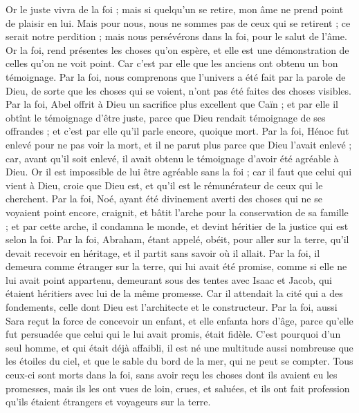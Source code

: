 \begin{multicols}{2}
Or le juste vivra de la foi ; mais si quelqu'un se retire, mon âme ne prend point de plaisir en lui.
Mais pour nous, nous ne sommes pas de ceux qui se retirent ; ce serait notre perdition ; mais nous persévérons dans la foi, pour le salut de l'âme.
\VerseOne{}Or la foi, rend présentes les choses qu'on espère, et elle est une démonstration de celles qu'on ne voit point.
Car c'est par elle que les anciens ont obtenu un bon témoignage.
Par la foi, nous comprenons que l'univers a été fait par la parole de Dieu, de sorte que les choses qui se voient, n'ont pas été faites des choses visibles.
Par la foi, Abel offrit à Dieu un sacrifice plus excellent que Caïn ; et par elle il obtînt le témoignage d'être juste, parce que Dieu rendait témoignage de ses offrandes ; et c'est par elle qu'il parle encore, quoique mort.
Par la foi, Hénoc fut enlevé pour ne pas voir la mort, et il ne parut plus parce que Dieu l'avait enlevé ; car, avant qu'il soit enlevé, il avait obtenu le témoignage d'avoir été agréable à Dieu.
Or il est impossible de lui être agréable sans la foi ; car il faut que celui qui vient à Dieu, croie que Dieu est, et qu'il est le rémunérateur de ceux qui le cherchent.
Par la foi, Noé, ayant été divinement averti des choses qui ne se voyaient point encore, craignit, et bâtit l'arche pour la conservation de sa famille ; et par cette arche, il condamna le monde, et devint héritier de la justice qui est selon la foi.
Par la foi, Abraham, étant appelé, obéit, pour aller sur la terre, qu'il devait recevoir en héritage, et il partit sans savoir où il allait.
Par la foi, il demeura comme étranger sur la terre, qui lui avait été promise, comme si elle ne lui avait point appartenu, demeurant sous des tentes avec Isaac et Jacob, qui étaient héritiers avec lui de la même promesse.
Car il attendait la cité qui a des fondements, celle dont Dieu est l'architecte et le constructeur.
Par la foi, aussi Sara reçut la force de concevoir un enfant, et elle enfanta hors d'âge, parce qu'elle fut persuadée que celui qui le lui avait promis, était fidèle.
C'est pourquoi d'un seul homme, et qui était déjà affaibli, il est né une multitude aussi nombreuse que les étoiles du ciel, et que le sable du bord de la mer, qui ne peut se compter.
Tous ceux-ci sont morts dans la foi, sans avoir reçu les choses dont ils avaient eu les promesses, mais ils les ont vues de loin, crues, et saluées, et ils ont fait profession qu'ils étaient étrangers et voyageurs sur la terre.

\end{multicols}
